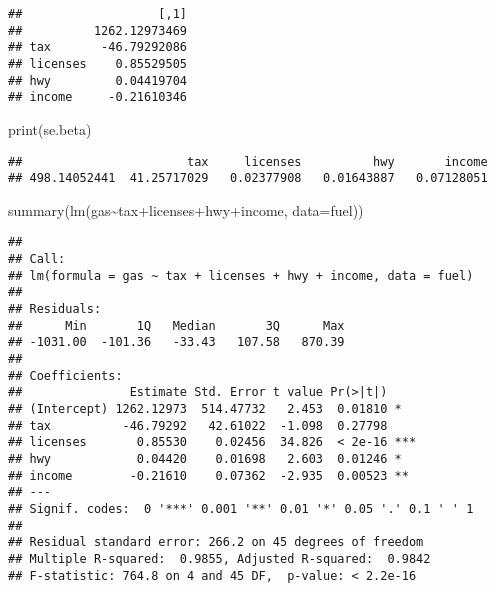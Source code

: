 \documentclass[
]{article}
\newenvironment{Shaded}{\begin{snugshade}}{\end{snugshade}}
\newcommand{\AttributeTok}[1]{\textcolor[rgb]{0.77,0.63,0.00}{#1}}
\newcommand{\FunctionTok}[1]{\textcolor[rgb]{0.00,0.00,0.00}{#1}}
\newcommand{\NormalTok}[1]{#1}
\newcommand{\SpecialCharTok}[1]{\textcolor[rgb]{0.00,0.00,0.00}{#1}}
\begin{document}
\begin{verbatim}
##                   [,1]
##          1262.12973469
## tax       -46.79292086
## licenses    0.85529505
## hwy         0.04419704
## income     -0.21610346
\end{verbatim}

\begin{Shaded}
\begin{Highlighting}[]
\FunctionTok{print}\NormalTok{(se.beta)}
\end{Highlighting}
\end{Shaded}

\begin{verbatim}
##                       tax     licenses          hwy       income 
## 498.14052441  41.25717029   0.02377908   0.01643887   0.07128051
\end{verbatim}

\begin{Shaded}
\begin{Highlighting}[]
\FunctionTok{summary}\NormalTok{(}\FunctionTok{lm}\NormalTok{(gas}\SpecialCharTok{\textasciitilde{}}\NormalTok{tax}\SpecialCharTok{+}\NormalTok{licenses}\SpecialCharTok{+}\NormalTok{hwy}\SpecialCharTok{+}\NormalTok{income, }\AttributeTok{data=}\NormalTok{fuel))}
\end{Highlighting}
\end{Shaded}

\begin{verbatim}
## 
## Call:
## lm(formula = gas ~ tax + licenses + hwy + income, data = fuel)
## 
## Residuals:
##      Min       1Q   Median       3Q      Max 
## -1031.00  -101.36   -33.43   107.58   870.39 
## 
## Coefficients:
##               Estimate Std. Error t value Pr(>|t|)    
## (Intercept) 1262.12973  514.47732   2.453  0.01810 *  
## tax          -46.79292   42.61022  -1.098  0.27798    
## licenses       0.85530    0.02456  34.826  < 2e-16 ***
## hwy            0.04420    0.01698   2.603  0.01246 *  
## income        -0.21610    0.07362  -2.935  0.00523 ** 
## ---
## Signif. codes:  0 '***' 0.001 '**' 0.01 '*' 0.05 '.' 0.1 ' ' 1
## 
## Residual standard error: 266.2 on 45 degrees of freedom
## Multiple R-squared:  0.9855, Adjusted R-squared:  0.9842 
## F-statistic: 764.8 on 4 and 45 DF,  p-value: < 2.2e-16
\end{verbatim}
\end{document}
